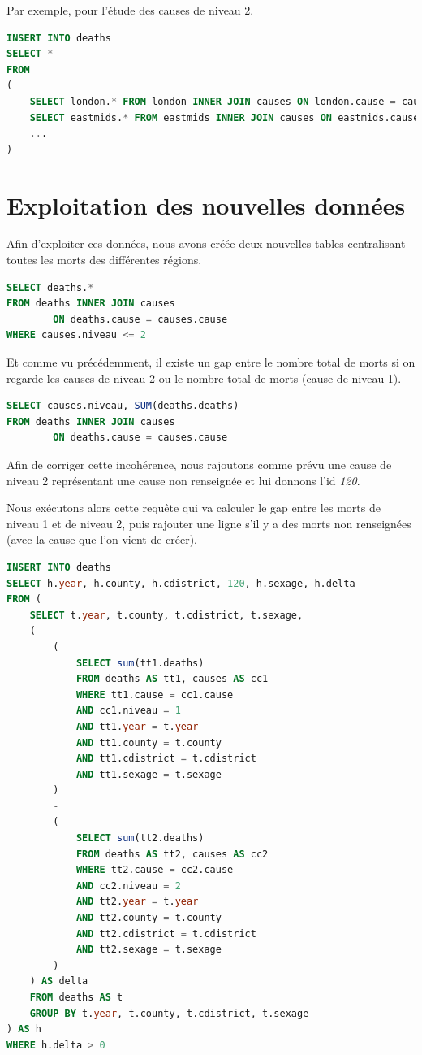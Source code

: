     Par exemple, pour l'étude des causes de niveau 2.

    \begin{lstlisting}[frame=single, language=SQL]
INSERT INTO deaths
SELECT *
FROM
(
    SELECT london.* FROM london INNER JOIN causes ON london.cause = causes.cause WHERE causes.niveau <= 2 UNION
    SELECT eastmids.* FROM eastmids INNER JOIN causes ON eastmids.cause = causes.cause WHERE causes.niveau <= 2 UNION
    ...
)
    \end{lstlisting}


\section{Exploitation des nouvelles données}

    Afin d'exploiter ces données, nous avons créée deux nouvelles tables centralisant toutes les morts des différentes régions.

    \begin{lstlisting}[frame=single, language=SQL]
SELECT deaths.*
FROM deaths INNER JOIN causes
        ON deaths.cause = causes.cause
WHERE causes.niveau <= 2
    \end{lstlisting}

    Et comme vu précédemment, il existe un gap entre le nombre total de morts si on regarde les causes de niveau 2 ou le nombre
    total de morts (cause de niveau 1).

    \begin{lstlisting}[frame=single, language=SQL]
SELECT causes.niveau, SUM(deaths.deaths)
FROM deaths INNER JOIN causes
        ON deaths.cause = causes.cause
    \end{lstlisting}

    Afin de corriger cette incohérence, nous rajoutons comme prévu une cause de niveau 2 représentant une cause non renseignée
    et lui donnons l'id \textit{120}.

    Nous exécutons alors cette requête qui va calculer le gap entre les morts de niveau 1 et de niveau 2, puis rajouter une ligne
    s'il y a des morts non renseignées (avec la cause que l'on vient de créer).

    \begin{lstlisting}[frame=single, language=SQL]
INSERT INTO deaths
SELECT h.year, h.county, h.cdistrict, 120, h.sexage, h.delta
FROM (
    SELECT t.year, t.county, t.cdistrict, t.sexage,
    (
        (
            SELECT sum(tt1.deaths)
            FROM deaths AS tt1, causes AS cc1
            WHERE tt1.cause = cc1.cause
            AND cc1.niveau = 1
            AND tt1.year = t.year
            AND tt1.county = t.county
            AND tt1.cdistrict = t.cdistrict
            AND tt1.sexage = t.sexage
        )
        -
        (
            SELECT sum(tt2.deaths)
            FROM deaths AS tt2, causes AS cc2
            WHERE tt2.cause = cc2.cause
            AND cc2.niveau = 2
            AND tt2.year = t.year
            AND tt2.county = t.county
            AND tt2.cdistrict = t.cdistrict
            AND tt2.sexage = t.sexage
        )
    ) AS delta
    FROM deaths AS t
    GROUP BY t.year, t.county, t.cdistrict, t.sexage
) AS h
WHERE h.delta > 0
    \end{lstlisting}

